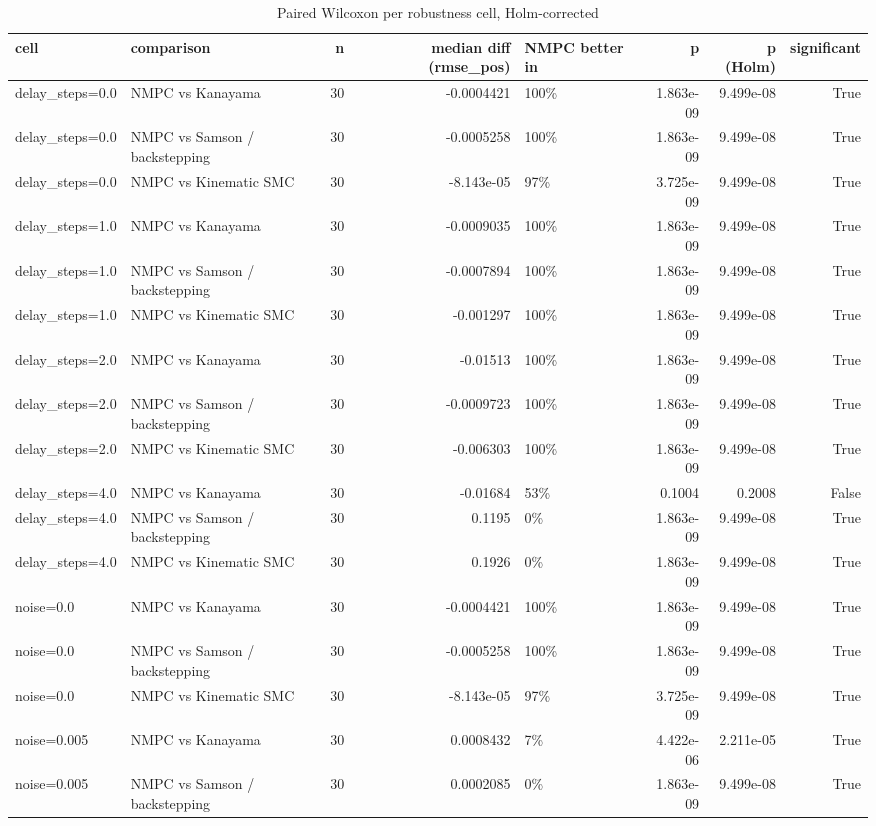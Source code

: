 \begin{table}
\caption{Paired Wilcoxon per robustness cell, Holm-corrected}
\label{tab:robustness_wilcoxon}
\begin{tabular}{llrrlrrr}
\toprule
cell & comparison & n & median diff (rmse\_pos) & NMPC better in & p & p (Holm) & significant \\
\midrule
delay\_steps=0.0 & NMPC vs Kanayama & 30 & -0.0004421 & 100\% & 1.863e-09 & 9.499e-08 & True \\
delay\_steps=0.0 & NMPC vs Samson / backstepping & 30 & -0.0005258 & 100\% & 1.863e-09 & 9.499e-08 & True \\
delay\_steps=0.0 & NMPC vs Kinematic SMC & 30 & -8.143e-05 & 97\% & 3.725e-09 & 9.499e-08 & True \\
delay\_steps=1.0 & NMPC vs Kanayama & 30 & -0.0009035 & 100\% & 1.863e-09 & 9.499e-08 & True \\
delay\_steps=1.0 & NMPC vs Samson / backstepping & 30 & -0.0007894 & 100\% & 1.863e-09 & 9.499e-08 & True \\
delay\_steps=1.0 & NMPC vs Kinematic SMC & 30 & -0.001297 & 100\% & 1.863e-09 & 9.499e-08 & True \\
delay\_steps=2.0 & NMPC vs Kanayama & 30 & -0.01513 & 100\% & 1.863e-09 & 9.499e-08 & True \\
delay\_steps=2.0 & NMPC vs Samson / backstepping & 30 & -0.0009723 & 100\% & 1.863e-09 & 9.499e-08 & True \\
delay\_steps=2.0 & NMPC vs Kinematic SMC & 30 & -0.006303 & 100\% & 1.863e-09 & 9.499e-08 & True \\
delay\_steps=4.0 & NMPC vs Kanayama & 30 & -0.01684 & 53\% & 0.1004 & 0.2008 & False \\
delay\_steps=4.0 & NMPC vs Samson / backstepping & 30 & 0.1195 & 0\% & 1.863e-09 & 9.499e-08 & True \\
delay\_steps=4.0 & NMPC vs Kinematic SMC & 30 & 0.1926 & 0\% & 1.863e-09 & 9.499e-08 & True \\
noise=0.0 & NMPC vs Kanayama & 30 & -0.0004421 & 100\% & 1.863e-09 & 9.499e-08 & True \\
noise=0.0 & NMPC vs Samson / backstepping & 30 & -0.0005258 & 100\% & 1.863e-09 & 9.499e-08 & True \\
noise=0.0 & NMPC vs Kinematic SMC & 30 & -8.143e-05 & 97\% & 3.725e-09 & 9.499e-08 & True \\
noise=0.005 & NMPC vs Kanayama & 30 & 0.0008432 & 7\% & 4.422e-06 & 2.211e-05 & True \\
noise=0.005 & NMPC vs Samson / backstepping & 30 & 0.0002085 & 0\% & 1.863e-09 & 9.499e-08 & True \\

\end{tabular}
\end{table}
